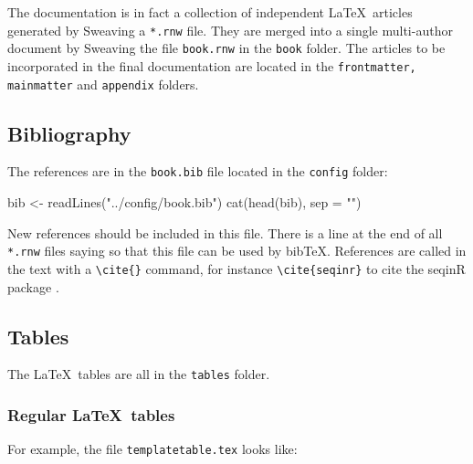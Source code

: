 \documentclass{article}
\begin{document}
The documentation is in fact a collection of independent \LaTeX~articles
generated by Sweaving a \texttt{*.rnw} file. They are merged into a
single multi-author document by Sweaving the file \texttt{book.rnw} in
the \texttt{book} folder. The articles to be incorporated in the final
documentation are located
in the \texttt{frontmatter, mainmatter} and \texttt{appendix} folders.

\subsection{Bibliography}

The references are in the \texttt{book.bib} file located in the
\texttt{config} folder:

\begin{Schunk}
\begin{Sinput}
 bib <- readLines("../config/book.bib")
 cat(head(bib), sep = "\n")
\end{Sinput}
\begin{Soutput}
@incollection{seqinr,
    author = {Charif, D. and Lobry, J.R.},
    title = {Seqin{R} 1.0-2: a contributed package to the {R} project for statistical computing devoted to biological sequences retrieval and analysis.},
    booktitle = {Structural approaches to sequence evolution: Molecules, networks, populations},
    year = {2007},
    editor = {U. Bastolla, M. Porto, H.E. Roman and M. Vendruscolo},
\end{Soutput}
\end{Schunk}

New references should be included in this file. There is a line at
the end of all \texttt{*.rnw} files saying
\verb!! so that this file can be
used by bibTeX. References are called in the text with a
\verb!\cite{}! command, for instance \verb!\cite{seqinr}! to
cite the seqinR package \cite{seqinr}.

\subsection{Tables}

The \LaTeX~tables are all in the \texttt{tables} folder.

\subsubsection{Regular \LaTeX~tables}

For example,
the file \texttt{templatetable.tex} looks like:
\end{document}
